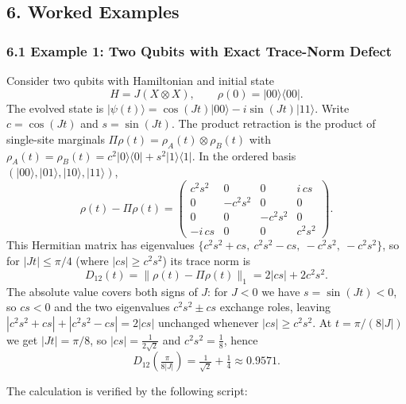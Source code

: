 \documentclass[
  11pt,
]{article}
\begin{document}
\subsection{6. Worked Examples}\label{worked-examples}

\subsubsection{6.1 Example 1: Two Qubits with Exact Trace-Norm Defect}\label{example-1-two-qubits-with-exact-trace-norm-defect}

Consider two qubits with Hamiltonian and initial state
\[H = J(X \otimes X), \qquad \rho(0) = |00\rangle\langle 00|.\]
The evolved state is \(|\psi(t)\rangle = \cos(Jt)|00\rangle - i\sin(Jt)|11\rangle\). Write \(c=\cos(Jt)\) and \(s=\sin(Jt)\). The product retraction is the product of single-site marginals \(\Pi\rho(t)=\rho_A(t)\otimes\rho_B(t)\) with \(\rho_A(t)=\rho_B(t)=c^2|0\rangle\langle0|+s^2|1\rangle\langle1|\). In the ordered basis \((|00\rangle,|01\rangle,|10\rangle,|11\rangle)\),
\[\rho(t)-\Pi\rho(t)=\begin{pmatrix} c^2s^2 & 0 & 0 & i\,cs\\ 0 & -c^2s^2 & 0 & 0\\ 0 & 0 & -c^2s^2 & 0\\ -i\,cs & 0 & 0 & c^2s^2 \end{pmatrix}.\]
This Hermitian matrix has eigenvalues \(\{c^2s^2+cs,\ c^2s^2-cs,\ -c^2s^2,\ -c^2s^2\}\), so for \(|Jt|\le\pi/4\) (where \(|cs|\ge c^2s^2\)) its trace norm is
\[D_{12}(t)=\lVert\rho(t)-\Pi\rho(t)\rVert_1 = 2|cs|+2c^2s^2.\]
The absolute value covers both signs of \(J\): for \(J<0\) we have \(s=\sin(Jt)<0\), so \(cs<0\) and the two eigenvalues \(c^2s^2\pm cs\) exchange roles, leaving \(|c^2s^2+cs|+|c^2s^2-cs|=2|cs|\) unchanged whenever \(|cs|\ge c^2s^2\). At \(t=\pi/(8|J|)\) we get \(|Jt|=\pi/8\), so \(|cs|=\tfrac{1}{2\sqrt2}\) and \(c^2s^2=\tfrac18\), hence
\[D_{12}\!\left(\tfrac{\pi}{8|J|}\right)=\tfrac{1}{\sqrt2}+\tfrac14\approx 0.9571.\]

The calculation is verified by the following script:
\end{document}
